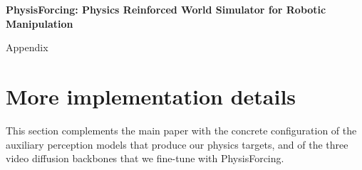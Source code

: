 \clearpage
\appendix

{
  \centering 
  \textbf{\Large PhysisForcing: Physics Reinforced World Simulator for Robotic Manipulation}
  
  \vspace{5pt}
  {\Large Appendix}
  \par
}

\section{More implementation details}
\label{appx:impl}

This section complements the main paper with the concrete configuration of the
auxiliary perception models that produce our physics targets, and of the three video
diffusion backbones that we fine-tune with PhysisForcing.

